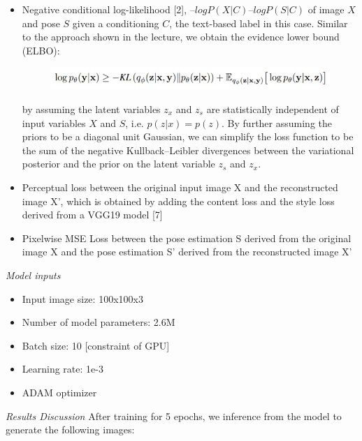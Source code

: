 \documentclass{article}
\begin{document}
\begin{itemize}
\item Negative conditional log-likelihood [2], $– log P(X|C) – log P(S|C)$ of image $X$ and pose $S$ given a conditioning $C$, the text-based label in this case. Similar to the approach shown in the lecture, we obtain the evidence lower bound (ELBO):
\begin{figure}[H]
    \centering
    \includegraphics[scale=1]{ELBO.jpg}
\end{figure}
by assuming the latent variables $z_x$ and $z_s$ are statistically independent of input variables $X$ and $S$, i.e. $p(z|x) = p(z)$. By further assuming the priors to be a diagonal unit Gaussian, we can simplify the loss function to be the sum of the negative Kullback–Leibler divergences between the variational posterior and the prior on the latent variable $z_s$ and $z_x$.  
\item Perceptual loss between the original input image X and the reconstructed image X’, which is obtained by adding the content loss and the style loss derived from a VGG19 model [7]
\item Pixelwise MSE Loss between the pose estimation S derived from the original image X and the pose estimation S’ derived from the reconstructed image X’
\end{itemize}

\noindent
\textit{Model inputs}
\begin{itemize}
\item Input image size: 100x100x3
\item Number of model parameters: 2.6M
\item Batch size: 10 [constraint of GPU]
\item Learning rate: 1e-3
\item ADAM optimizer
\end{itemize}

\noindent
\textit{Results Discussion}
\newline
\newline
After training for 5 epochs, we inference from the model to generate the following images:
\end{document}
